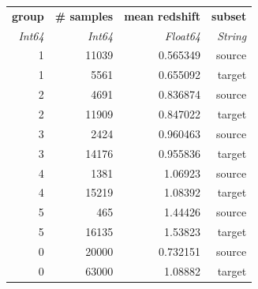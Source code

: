 \begin{tabular}{|r|r|r|r|}
  \hline
  \textbf{group} & \textbf{\# samples} & \textbf{mean redshift} & \textbf{subset} \\
  \textit{Int64} & \textit{Int64} & \textit{Float64} & \textit{String} \\
  \hline
  1 & 11039 & 0.565349 & source \\
  1 & 5561 & 0.655092 & target \\
  2 & 4691 & 0.836874 & source \\
  2 & 11909 & 0.847022 & target \\
  3 & 2424 & 0.960463 & source \\
  3 & 14176 & 0.955836 & target \\
  4 & 1381 & 1.06923 & source \\
  4 & 15219 & 1.08392 & target \\
  5 & 465 & 1.44426 & source \\
  5 & 16135 & 1.53823 & target \\
  0 & 20000 & 0.732151 & source \\
  0 & 63000 & 1.08882 & target \\
  \hline
\end{tabular}
